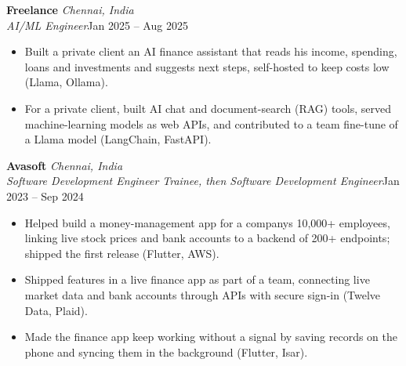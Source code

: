 \documentclass[a4paper,11pt]{article}
\newcommand{\role}[4]{%
  \textbf{#1}{\color{muted}\,\textperiodcentered\,\textit{#2}}\\
  \textit{#4}\hfill{\color{muted}#3}\par}
\newcommand{\gap}{\vspace{5pt}}
\begin{document}
\gap
{}
\role{Freelance}{Chennai, India}{Jan 2025 – Aug 2025}{AI/ML Engineer}
\begin{itemize}
  \item Built a private client an AI finance assistant that reads his income, spending, loans and investments and suggests next steps, self-hosted to keep costs low (Llama, Ollama).
  \item For a private client, built AI chat and document-search (RAG) tools, served machine-learning models as web APIs, and contributed to a team fine-tune of a Llama model (LangChain, FastAPI).
\end{itemize}
\gap
{}
\role{Avasoft}{Chennai, India}{Jan 2023 – Sep 2024}{Software Development Engineer Trainee, then Software Development Engineer}
\begin{itemize}
  \item Helped build a money-management app for a company\textquotesingle{}s 10,000+ employees, linking live stock prices and bank accounts to a backend of 200+ endpoints; shipped the first release (Flutter, AWS).
  \item Shipped features in a live finance app as part of a team, connecting live market data and bank accounts through APIs with secure sign-in (Twelve Data, Plaid).
  \item Made the finance app keep working without a signal by saving records on the phone and syncing them in the background (Flutter, Isar).
\end{itemize}
\end{document}

